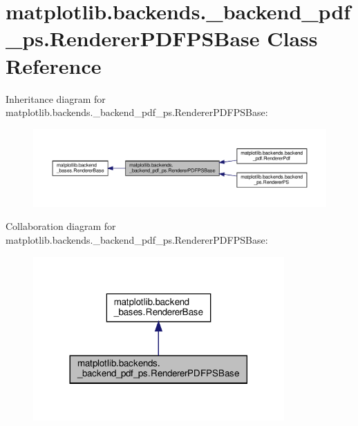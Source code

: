 \hypertarget{classmatplotlib_1_1backends_1_1__backend__pdf__ps_1_1RendererPDFPSBase}{}\section{matplotlib.\+backends.\+\_\+backend\+\_\+pdf\+\_\+ps.\+Renderer\+P\+D\+F\+P\+S\+Base Class Reference}
\label{classmatplotlib_1_1backends_1_1__backend__pdf__ps_1_1RendererPDFPSBase}


Inheritance diagram for matplotlib.\+backends.\+\_\+backend\+\_\+pdf\+\_\+ps.\+Renderer\+P\+D\+F\+P\+S\+Base\+:
\nopagebreak
\begin{figure}[H]
\begin{center}
\leavevmode
\includegraphics[width=350pt]{classmatplotlib_1_1backends_1_1__backend__pdf__ps_1_1RendererPDFPSBase__inherit__graph}
\end{center}
\end{figure}


Collaboration diagram for matplotlib.\+backends.\+\_\+backend\+\_\+pdf\+\_\+ps.\+Renderer\+P\+D\+F\+P\+S\+Base\+:
\nopagebreak
\begin{figure}[H]
\begin{center}
\leavevmode
\includegraphics[width=272pt]{classmatplotlib_1_1backends_1_1__backend__pdf__ps_1_1RendererPDFPSBase__coll__graph}
\end{center}
\end{figure}
